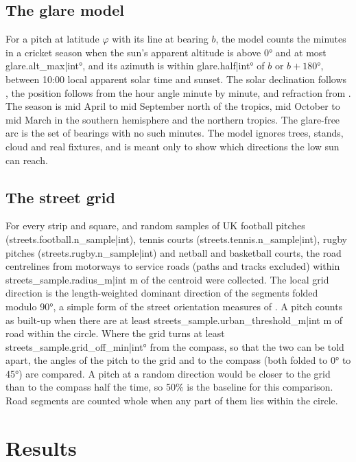 \documentclass[11pt,a4paper]{article}
\begin{document}
\subsection{The glare model}
For a pitch at latitude $\varphi$ with its line at bearing $b$, the model counts the minutes in a cricket season when the sun's apparent altitude is above 0° and at most {{glare.alt_max|int}}°, and its azimuth is within {{glare.half|int}}° of $b$ or $b+180°$, between 10:00 local apparent solar time and sunset. The solar declination follows \citet{spencer}, the position follows from the hour angle minute by minute, and refraction from \citet{bennett}. The season is mid April to mid September north of the tropics, mid October to mid March in the southern hemisphere and the northern tropics. The glare-free arc is the set of bearings with no such minutes. The model ignores trees, stands, cloud and real fixtures, and is meant only to show which directions the low sun can reach.

\subsection{The street grid}
For every strip and square, and random samples of UK football pitches ({{streets.football.n_sample|int}}), tennis courts ({{streets.tennis.n_sample|int}}), rugby pitches ({{streets.rugby.n_sample|int}}) and netball and basketball courts, the road centrelines from motorways to service roads (paths and tracks excluded) within {{streets_sample.radius_m|int}} m of the centroid were collected. The local grid direction is the length-weighted dominant direction of the segments folded modulo 90°, a simple form of the street orientation measures of \citet{boeing}. A pitch counts as built-up when there are at least {{streets_sample.urban_threshold_m|int}} m of road within the circle. Where the grid turns at least {{streets_sample.grid_off_min|int}}° from the compass, so that the two can be told apart, the angles of the pitch to the grid and to the compass (both folded to 0° to 45°) are compared. A pitch at a random direction would be closer to the grid than to the compass half the time, so 50\% is the baseline for this comparison. Road segments are counted whole when any part of them lies within the circle.

\section{Results}
\end{document}
